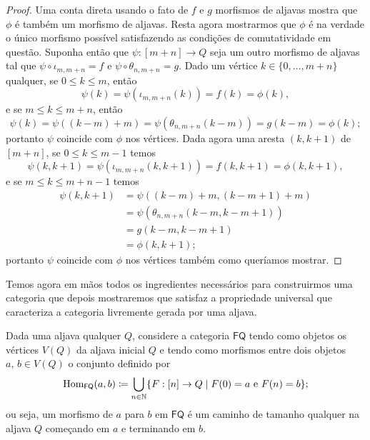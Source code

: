 \begin{proof}
    Uma conta direta usando o fato de $f$ e $g$ morfismos de aljavas mostra que $\phi$ é também um morfismo de aljavas.
    Resta agora mostrarmos que $\phi$ é na verdade o único morfismo possível satisfazendo as condições de comutatividade em questão.
    Suponha então que $\psi: [m+n] \to Q$ seja um outro morfismo de aljavas tal que $\psi \circ \iota_{m,m+n} = f$ e $\psi \circ \theta_{n,m+n} = g$.
    Dado um vértice $k \in \{0,\dots,m+n\}$ qualquer, se $0 \leq k \leq m$, então
    \begin{displaymath}
        \psi(k) = \psi(\iota_{m,m+n}(k)) = f(k) = \phi(k),
    \end{displaymath}
    e se $m \leq k \leq m+n$, então
    \begin{displaymath}
        \psi(k) = \psi((k-m)+m) = \psi(\theta_{n,m+n}(k-m)) = g(k-m) = \phi(k);
    \end{displaymath}
    portanto $\psi$ coincide com $\phi$ nos vértices.
    Dada agora uma aresta $(k,k+1)$ de $[m+n]$, se $0 \leq k \leq m-1$ temos
    \begin{displaymath}
        \psi(k,k+1) = \psi(\iota_{m,m+n}(k,k+1)) = f(k,k+1) = \phi(k,k+1),
    \end{displaymath}
    e se $m \leq k \leq m+n-1$ temos
    \begin{align*}
        \psi(k,k+1)
        & = \psi((k-m)+m,(k-m+1)+m) \\
        & = \psi(\theta_{n,m+n}(k-m,k-m+1)) \\
        & = g(k-m,k-m+1) \\
        & = \phi(k,k+1);
    \end{align*}
    portanto $\psi$ coincide com $\phi$ nos vértices também como queríamos mostrar.
\end{proof}

Temos agora em mãos todos os ingredientes necessários para construirmos uma categoria que depois mostraremos que satisfaz a propriedade universal que caracteriza a categoria livremente gerada por uma aljava.

Dada uma aljava qualquer $Q$, considere a categoria $\mathsf{FQ}$ tendo como objetos os vértices $V(Q)$ da aljava inicial $Q$ e tendo como morfismos entre dois objetos $a,\, b \in V(Q)$ o conjunto definido por
\begin{equation}\label{eq:morfismo_categoria_livre_defin}
    \mathrm{Hom}_{\mathsf{FQ}}(a,b) \coloneqq \bigcup_{n \in \mathbb{N}} \{F: [n] \to Q \mid F(0) = a \text{ e } F(n) = b\};
\end{equation}
ou seja, um morfismo de $a$ para $b$ em $\mathsf{FQ}$ é um caminho de tamanho qualquer na aljava $Q$ começando em $a$ e terminando em $b$.

